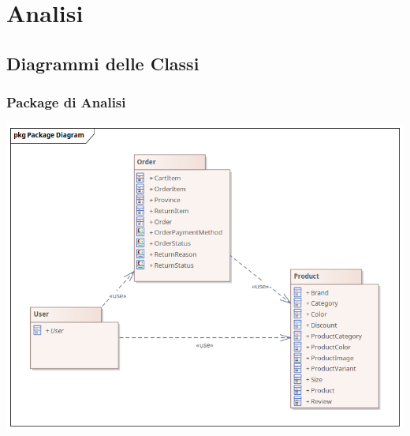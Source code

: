 \chapter{Analisi}
\label{ch:Analisi}
\section{Diagrammi delle Classi}
\subsection{Package di Analisi}
\begin{center}
  \includegraphics[width=\textwidth]{immagini/Analisi/ClassDiagrams/Package.png}
\end{center}

